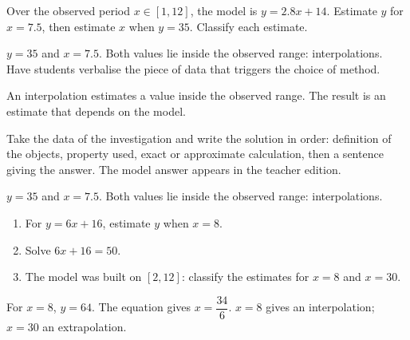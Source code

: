 \begin{activity}
Over the observed period $x\in[1,12]$, the model is $y=\num{2,8}x+14$. Estimate $y$ for $x=\num{7,5}$, then estimate $x$ when $y=35$. Classify each estimate.
\begin{center}\end{center}
\end{activity}
\begin{solution}$y=35$ and $x=\num{7,5}$. Both values lie inside the observed range: interpolations. Have students verbalise the piece of data that triggers the choice of method.\end{solution}

\begin{summary}An interpolation estimates a value inside the observed range. The result is an estimate that depends on the model.\end{summary}

\begin{example}
Take the data of the investigation and write the solution in order: definition of the objects, property used, exact or approximate calculation, then a sentence giving the answer. The model answer appears in the teacher edition.
\end{example}
\begin{solution}$y=35$ and $x=\num{7,5}$. Both values lie inside the observed range: interpolations.\end{solution}

\begin{exercise}[essential]
\begin{enumerate}\item For $y=6x+16$, estimate $y$ when $x=8$.\item Solve $6x+16=50$.\item The model was built on $[2,12]$: classify the estimates for $x=8$ and $x=30$.\end{enumerate}
\end{exercise}
\begin{solution}For $x=8$, $y=64$. The equation gives $x=\dfrac{34}{6}$. $x=8$ gives an interpolation; $x=30$ an extrapolation.\end{solution}

